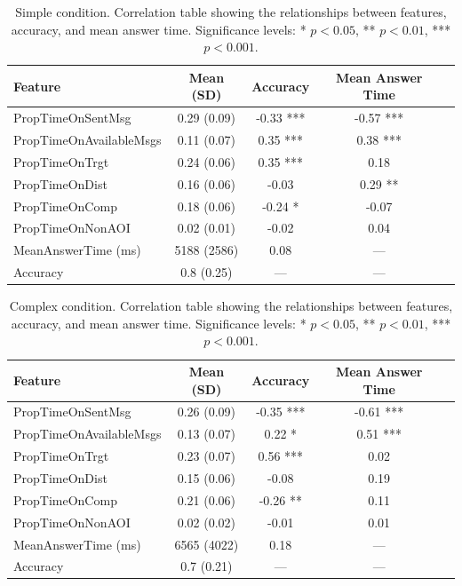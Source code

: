 \begin{table}[h!]
\centering
\begin{tabular}{|l|c|c|c|c|}
\hline
\textbf{Feature} & \textbf{Mean (SD)} & \textbf{Accuracy} & \textbf{Mean Answer Time} \\ \hline
PropTimeOnSentMsg & 0.29 (0.09) & -0.33 *** & -0.57 *** \\ \hline
PropTimeOnAvailableMsgs & 0.11 (0.07) & 0.35 *** & 0.38 *** \\ \hline
PropTimeOnTrgt & 0.24 (0.06) & 0.35 *** & 0.18 \\ \hline
PropTimeOnDist & 0.16 (0.06) & -0.03 & 0.29 ** \\ \hline
PropTimeOnComp & 0.18 (0.06) & -0.24 * & -0.07 \\ \hline
PropTimeOnNonAOI & 0.02 (0.01) & -0.02 & 0.04 \\ \hline
MeanAnswerTime (ms) & 5188 (2586) & 0.08 & --- \\ \hline
Accuracy & 0.8 (0.25) & --- & --- \\ \hline
\end{tabular}
\caption{Simple condition. Correlation table showing the relationships between features, accuracy, and mean answer time. Significance levels: * $p < 0.05$, ** $p < 0.01$, *** $p < 0.001$.}
\label{tab:correlation_table_simple}
\end{table}

\begin{table}[h!]
\centering
\begin{tabular}{|l|c|c|c|c|}
\hline
\textbf{Feature} & \textbf{Mean (SD)} & \textbf{Accuracy} & \textbf{Mean Answer Time} \\ \hline
PropTimeOnSentMsg & 0.26 (0.09) & -0.35 *** & -0.61 *** \\ \hline
PropTimeOnAvailableMsgs & 0.13 (0.07) & 0.22 * & 0.51 *** \\ \hline
PropTimeOnTrgt & 0.23 (0.07) & 0.56 *** & 0.02 \\ \hline
PropTimeOnDist & 0.15 (0.06) & -0.08 & 0.19 \\ \hline
PropTimeOnComp & 0.21 (0.06) & -0.26 ** & 0.11 \\ \hline
PropTimeOnNonAOI & 0.02 (0.02) & -0.01 & 0.01 \\ \hline
MeanAnswerTime (ms) & 6565 (4022) & 0.18 & --- \\ \hline
Accuracy & 0.7 (0.21) & --- & --- \\ \hline
\end{tabular}
\caption{Complex condition. Correlation table showing the relationships between features, accuracy, and mean answer time. Significance levels: * $p < 0.05$, ** $p < 0.01$, *** $p < 0.001$.}
\label{tab:correlation_table_complex}
\end{table}

